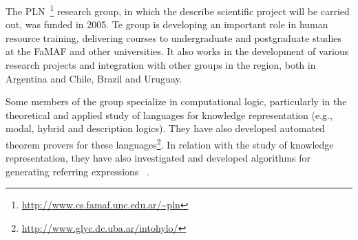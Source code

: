 

The PLN~\footnote{\url{http://www.cs.famaf.unc.edu.ar/~pln}} research group, 
in which the describe scientific project will be carried out, was funded in 2005.
Te group is developing an important role in human resource training,
delivering courses to undergraduate and postgraduate studies at the FaMAF and
other universities. It also works in the development of various research
projects and integration with other groups in the region, both in Argentina and
Chile, Brazil and Uruguay. 



Some members of the group specialize in computational logic, particularly in
the theoretical and applied study of languages for knowledge representation (e.g.,
modal, hybrid and description logics). They have also developed 
automated theorem provers for these languages\footnote{\url{http://www.glyc.dc.uba.ar/intohylo/}}. In relation with 
the study of knowledge representation, they have also investigated and developed algorithms for generating referring expressions ~\cite{AKS08}.

